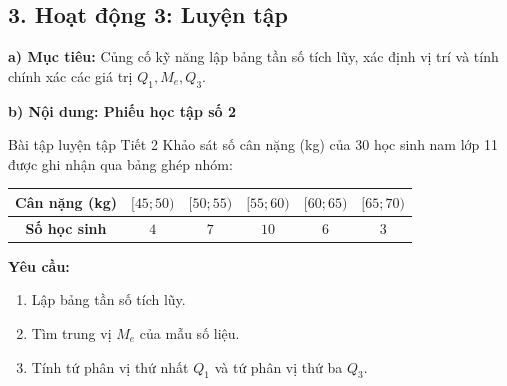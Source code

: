 \documentclass[12pt, a4paper]{article}
\begin{document}
\subsection*{3. Hoạt động 3: Luyện tập}

\noindent \textbf{a) Mục tiêu:}
Củng cố kỹ năng lập bảng tần số tích lũy, xác định vị trí và tính chính xác các giá trị $Q_1, M_e, Q_3$.

\noindent \textbf{b) Nội dung: Phiếu học tập số 2}
\begin{pedabox}{Bài tập luyện tập Tiết 2}
Khảo sát số cân nặng (kg) của $30$ học sinh nam lớp 11 được ghi nhận qua bảng ghép nhóm:
\begin{center}
\small
\begin{tabular}{|c|c|c|c|c|c|}
\hline
\textbf{Cân nặng (kg)} & $[45; 50)$ & $[50; 55)$ & $[55; 60)$ & $[60; 65)$ & $[65; 70)$ \\ \hline
\textbf{Số học sinh} & $4$ & $7$ & $10$ & $6$ & $3$ \\ \hline
\end{tabular}
\end{center}
\textbf{Yêu cầu:}
\begin{enumerate}[leftmargin=0.6cm]
    \item Lập bảng tần số tích lũy.
    \item Tìm trung vị $M_e$ của mẫu số liệu.
    \item Tính tứ phân vị thứ nhất $Q_1$ và tứ phân vị thứ ba $Q_3$.
\end{enumerate}
\end{pedabox}
\end{document}
